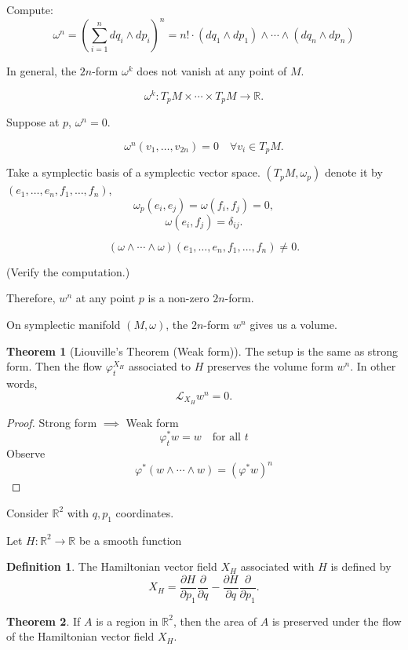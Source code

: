 \documentclass[11pt]{article}
\theoremstyle{definition}
\newtheorem{definition}{Definition}[section]
\newtheorem{theorem}{Theorem}[section]
\theoremstyle{remark}
\begin{document}
Compute:
\[
\omega^n = \left(\sum_{i=1}^n dq_i \wedge dp_i\right)^n = n! \cdot (dq_1 \wedge dp_1) \wedge \cdots \wedge (dq_n \wedge dp_n)
\]

In general, the $2n$-form $\omega^k$ does not vanish at any point of $M$.

\[
\omega^k : T_p M \times \cdots \times T_p M \to \mathbb{R}.
\]

Suppose at $p$, $\omega^n = 0$.

\[
\omega^n(v_1, \dots, v_{2n}) = 0 \quad \forall v_i \in T_p M.
\]

Take a symplectic basis of a symplectic vector space.
$(T_p M, \omega_p)$ denote it by $(e_1, \dots, e_n, f_1, \dots, f_n)$,
\[
\omega_p(e_i, e_j) = \omega(f_i, f_j) = 0,
\]
\[
\omega(e_i, f_j) = \delta_{ij}.
\]

\[
(\omega \wedge \cdots \wedge \omega)(e_1, \dots, e_n, f_1, \dots, f_n) \neq 0.
\]

(Verify the computation.)

Therefore, $w^n$ at any point $p$ is a non-zero $2n$-form.

On symplectic manifold $(M, \omega)$, the $2n$-form $w^n$ gives us a volume.

\begin{theorem}[Liouville's Theorem (Weak form)]
The setup is the same as strong form. Then the flow $\varphi_t^{X_H}$ associated to $H$ preserves the volume form $w^n$. In other words,
\[
\mathcal{L}_{X_H} w^n = 0.
\]
\end{theorem}

\begin{proof}
Strong form $\implies$ Weak form
\[
\varphi_t^* w = w \quad \text{for all } t
\]
Observe
\[
\varphi^* (w \wedge \cdots \wedge w) = (\varphi^* w)^n
\]
\end{proof}

Consider $\mathbb{R}^2$ with $q, p_1$ coordinates.

Let $H: \mathbb{R}^2 \to \mathbb{R}$ be a smooth function

\begin{definition}\label{def:hamflow}
The Hamiltonian vector field $X_H$ associated with $H$ is defined by
\[
X_H = \frac{\partial H}{\partial p_1} \frac{\partial}{\partial q} - \frac{\partial H}{\partial q} \frac{\partial}{\partial p_1}.
\]
\end{definition}

\begin{theorem}\label{thm:area-preservation}
If $A$ is a region in $\mathbb{R}^2$, then the area of $A$ is preserved under the flow of the Hamiltonian vector field $X_H$.
\end{theorem}
\end{document}
